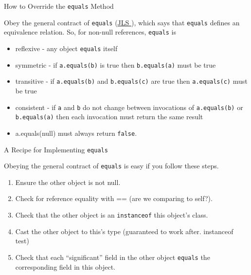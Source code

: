 \documentclass{beamer}
\begin{document}
\begin{frame}[fragile]{How to Override the {\tt equals} Method}


Obey the general contract of {\tt equals} (\href{}{JLS }), which says that {\tt equals} defines an equivalence relation.  So, for non-null references, {\tt equals} is
\begin{itemize}
\item reflexive - any object {\tt equals} itself
\item symmetric - if {\tt a.equals(b)} is true then {\tt b.equals(a)} must be true
\item transitive - if {\tt a.equals(b)} and {\tt b.equals(c)} are true then {\tt a.equals(c)} must be true
\item consistent - if {\tt a} and {\tt b} do not change between invocations of {\tt a.equals(b)} or {\tt b.equals(a)} then each invocation must return the same result
\item a.equals(null) must always return {\tt false}.
\end{itemize}


\end{frame}


\begin{frame}[fragile]{A Recipe for Implementing {\tt equals}}


Obeying the general contract of {\tt equals} is easy if you follow these steps.\\

\begin{enumerate}
\item Ensure the other object is not null.
\item Check for reference equality with == (are we comparing to self?).
\item Check that the other object is an {\tt instanceof} this object's class.
\item Cast the other object to this's type (guaranteed to work after. instanceof test)
\item Check that each ``significant'' field in the other object {\tt equals} the corresponding field in this object.
\end{enumerate}



\end{frame}
\end{document}

